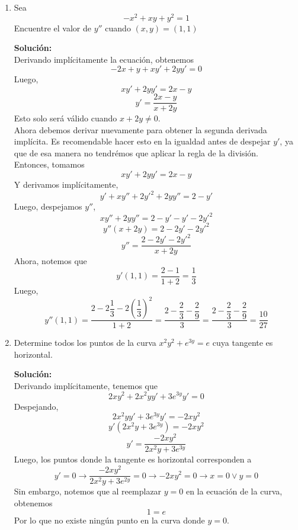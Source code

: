 \documentclass[12pt]{article}
\newenvironment{solucion}
{\begin{mdframed}[backgroundcolor=black!10]
		{\bf Solución:}\\
	}
	{
	\end{mdframed}
}
\newenvironment{preguntas}
{\begin{enumerate}\itemsep12pt
	}
	{
	\end{enumerate}
}
\newcommand{\ra}{\rightarrow}
\begin{document}
\begin{preguntas}
\begin{solucion}
$$\dfrac{\delta}{\delta x} y = y'$$
En resumen, cuando estemos derivando algo que tenga un $y$ (o algo que no se este derivando en función de su misma variable), cuando hayamos terminado de derivar aplicamos el último paso de la regla de la cadena (que usualmente omitimos porque la derivada de $x$ es 1) y lo dejamos expresado como $y'$
\begin{enumerate}[a)]
\item $x^2+y^2-7=0$\\
\\
Derivamos toda la igualdad en función de $x$, esto es
$$2x + 2yy' = 0 $$
Y luego, despejamos $y'$
$$y' = -\dfrac{x}{y}$$
\item $x^2y-xy^2+y^2=4$\\
\\
Derivamos en función de $x$,
$$(x^2y)'-(xy^2)'+(y^2)'=0$$
$$2xy + x^2y'-y^2 - 2yy'x+2yy'=0$$
Dejamos todo lo que tenga $y'$ a un lado,
$$x^2y' - 2yy'x+2yy'= -2xy +y^2$$
$$y'(x^2 - 2yx+2y)= -2xy +y^2$$
Finalmente,
$$y'= \dfrac{-2xy +y^2}{x^2 - 2yx+2y}$$
\end{enumerate}
\end{solucion}
\item Sea
$$-x^2+xy+y^2=1$$
Encuentre el valor de $y''$ cuando $(x,y)=(1,1)$
\begin{solucion}
Derivando implícitamente la ecuación, obtenemos
$$-2x + y + xy' + 2yy' = 0$$
Luego,
$$xy' + 2yy' = 2x-y$$
$$y' = \dfrac{2x-y}{x+2y}$$
Esto solo será válido cuando $x+2y\neq 0$.\\

Ahora debemos derivar nuevamente para obtener la segunda derivada implícita. Es recomendable hacer esto en la igualdad antes de despejar $y'$, ya que de esa manera no tendrémos que aplicar la regla de la división. \\

Entonces, tomamos
$$xy' + 2yy' = 2x-y$$
Y derivamos implícitamente,
$$y' + xy'' + 2y'^2+2yy'' = 2 - y'$$
Luego, despejamos $y''$,
$$xy''+2yy'' = 2 - y' - y' - 2y'^2$$
$$y''(x+2y) = 2 - 2y' - 2y'^2$$
$$y'' = \dfrac{2 - 2y' - 2y'^2}{x+2y}$$
Ahora, notemos que
$$y'(1,1) = \dfrac{2-1}{1+2} = \dfrac{1}{3}$$
Luego,
$$y''(1,1) = \dfrac{2-2\dfrac{1}{3} - 2\left(\dfrac{1}{3}\right)^2}{1+2} 
= \dfrac{2-\dfrac{2}{3}-\dfrac{2}{9}}{3}
= \dfrac{2-\dfrac{2}{3}-\dfrac{2}{9}}{3}
= \dfrac{10}{27}
$$
\end{solucion}
\item Determine todos los puntos de la curva $x^2y^2 + e^{3y} = e$ cuya tangente es horizontal.
\begin{solucion}
Derivando implícitamente, tenemos que
$$2xy^2 + 2x^2yy' + 3e^{3y}y' = 0$$
Despejando,
$$2x^2yy' + 3e^{3y}y' = -2xy^2$$
$$y'(2x^2y + 3e^{3y}) = -2xy^2$$
$$y' = \dfrac{-2xy^2}{2x^2y + 3e^{3y}}$$
Luego, los puntos donde la tangente es horizontal corresponden a
$$y'= 0 \ra \dfrac{-2xy^2}{2x^2y + 3e^{2y}} = 0 \ra -2xy^2 = 0 \ra x = 0 \vee y = 0$$
Sin embargo, notemos que al reemplazar $y=0$ en la ecuación de la curva, obtenemos
$$1 = e$$
Por lo que no existe ningún punto en la curva donde $y=0$.\\


\end{solucion}
\end{preguntas}
\end{document}
